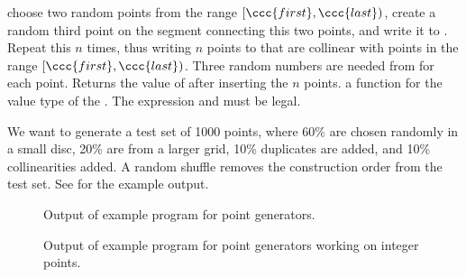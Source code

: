 { choose two random points from the range $[\ccc{first},\ccc{last})$,
    create a random third point on the segment connecting this two
    points, and write it to . Repeat this $n$ times, thus
    writing $n$ points to  that are collinear with points
    in the range $[\ccc{first},\ccc{last})$.
    Three random numbers are needed from  for each point.
    Returns the value of  after inserting the $n$ points.
  \ccPrecond a function  for the value type of
    the . 
    The expression  and
     must be legal. 
}

\ccExample

We want to generate a test set of 1000 points, where 60\% are chosen
randomly in a small disc, 20\% are from a larger grid, 10\% duplicates
are added, and 10\% collinearities added. A random shuffle removes the
construction order from the test set. See  for the example output.


\begin{ccTexOnly}
  \begin{figure}
    \noindent
    \hspace*{0.025\textwidth}%
    \begin{minipage}{0.45\textwidth}%
      \caption{Output of example program for point generators.}
      \label{figurePointGenerator}
    \end{minipage}%
    \hspace*{0.05\textwidth}%
    \begin{minipage}{0.45\textwidth}%
      \caption{Output of example program for point generators working
        on integer points.}
      \label{figureIntegerPointGenerator}
    \end{minipage}%
  \end{figure}
\end{ccTexOnly}

